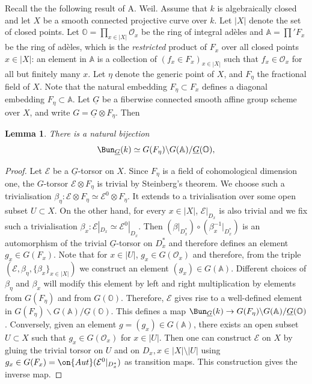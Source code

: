 \documentclass[]{pcmi}
\theoremstyle{plain}
\newtheorem{lem}[equation]{Lemma}
\theoremstyle{remark}
\theoremstyle{definition}
\newcommand{\bA}{{\mathbb A}}
\newcommand{\bO}{{\mathbb O}}
\newcommand{\mE}{{\mathcal E}}
\newcommand{\mO}{{\mathcal O}}
\newcommand{\Aut}{{\on{Aut}}}
\begin{document}
Recall the the following result of A. Weil. Assume that $k$ is algebraically closed and let $X$ be a smooth connected projective curve over $k$. Let $|X|$ denote the set of closed points. Let $\bO=\prod_{x\in |X|} \mO_x$ be the ring of integral ad\`eles and $\bA=\prod' F_x$ be the ring of ad\`eles, which is the \emph{restricted} product of $F_x$ over all closed points $x\in |X|$: an element in $\bA$ is a collection of $(f_x\in F_x)_{x\in |X|}$ such that $f_x\in \mO_x$ for all but finitely many $x$. Let $\eta$ denote the generic point of $X$, and $F_\eta$ the fractional field of $X$. Note that the natural embedding $F_\eta\subset F_x$ defines a diagonal embedding $F_\eta\subset \bA$.
Let $\underline G$ be a fiberwise connected smooth affine group scheme over $X$, and write $G=\underline G\otimes F_\eta$. 
Then
\begin{lem} There is a natural bijection
\begin{equation}\label{Weil}
\Bun_{\underline G}(k)\simeq G(F_\eta)\backslash G(\bA)/\underline G(\bO),
\end{equation}
\end{lem}
\begin{proof} Let $\mE$ be a $\underline G$-torsor on $X$. Since $F_\eta$ is a field of cohomological dimension one, the $G$-torsor $\mE\otimes F_\eta$ is trivial by Steinberg's theorem. We choose such a trivialisation $\beta_\eta: \mE\otimes F_\eta\simeq \mE^0\otimes F_\eta$. It extends to a trivialisation over some open subset $U\subset X$.
On the other hand, for every $x\in |X|$, $\mE|_{D_x}$ is also trivial and we fix such a trivialisation $\beta_x: \mE|_{D_x}\simeq \mE^0|_{D_x}$. Then $(\beta|_{D_x^*})\circ(\beta_x^{-1}|_{D_x^*})$ is an automorphism of the trivial $\underline G$-torsor on $D_x^*$ and therefore defines an element $g_x\in G(F_x)$. Note that for $x\in |U|$, $g_x\in G(\mO_x)$ and therefore, from the triple $(\mE,\beta_\eta,\{\beta_x\}_{x\in |X|})$ we construct an element $(g_x)\in G(\bA)$. Different choices of $\beta_\eta$ and $\beta_x$ will modify this element by left and right multiplication by elements from $G(F_\eta)$ and from $G(\bO)$. Therefore,
$\mE$ gives rise to a well-defined element in $G(F_\eta)\backslash G(\bA)/\underline G(\bO)$. This defines a map $\Bun_{\underline G}(k)\to G(F_\eta)\backslash G(\bA)/\underline G(\bO)$.
Conversely, given an element $g=(g_x)\in G(\bA)$, there exists an open subset $U\subset X$ such that $g_x\in G(\mO_x)$ for $x\in |U|$. Then
one can construct $\mE$ on $X$ by gluing the trivial torsor on $U$ and on $D_x, x\in |X|\setminus |U|$ using $g_x\in G(F_x)=\Aut(\mE^0|_{D_x^*})$ as transition maps. This construction gives the inverse map. 
\end{proof}
\end{document}
